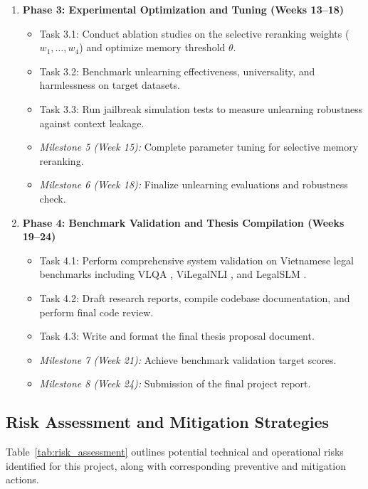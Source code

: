 \begin{enumerate}
    \item \textbf{Phase 3: Experimental Optimization and Tuning (Weeks 13--18)}
    \begin{itemize}
        \item Task 3.1: Conduct ablation studies on the selective reranking weights ($w_1, \dots, w_4$) and optimize memory threshold $\theta$.
        \item Task 3.2: Benchmark unlearning effectiveness, universality, and harmlessness on target datasets.
        \item Task 3.3: Run jailbreak simulation tests to measure unlearning robustness against context leakage.
        \item \textit{Milestone 5 (Week 15):} Complete parameter tuning for selective memory reranking.
        \item \textit{Milestone 6 (Week 18):} Finalize unlearning evaluations and robustness check.
    \end{itemize}

    \item \textbf{Phase 4: Benchmark Validation and Thesis Compilation (Weeks 19--24)}
    \begin{itemize}
        \item Task 4.1: Perform comprehensive system validation on Vietnamese legal benchmarks including VLQA \parencite{nguyen2025vlqacomprehensivelargehighquality}, ViLegalNLI \parencite{duong2026vilegalnlinaturallanguageinference}, and LegalSLM \parencite{le-etal-2025-overview}.
        \item Task 4.2: Draft research reports, compile codebase documentation, and perform final code review.
        \item Task 4.3: Write and format the final thesis proposal document.
        \item \textit{Milestone 7 (Week 21):} Achieve benchmark validation target scores.
        \item \textit{Milestone 8 (Week 24):} Submission of the final project report.
    \end{itemize}
\end{enumerate}

\subsection{Risk Assessment and Mitigation Strategies}
Table~\ref{tab:risk_assessment} outlines potential technical and operational risks identified for this project, along with corresponding preventive and mitigation actions.

